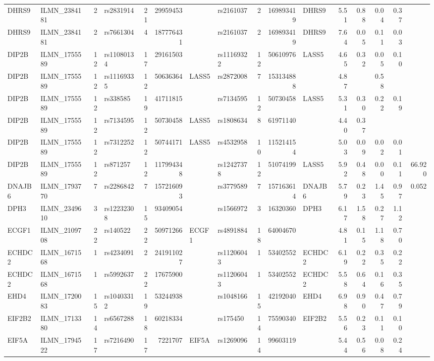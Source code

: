 \documentclass{article}
\begin{document}
\begin{landscape}
{\begin{ThreePartTable}
\begin{longtable}{|llr|lrrl|lrrl|rrrr|r|}
DHRS9 & ILMN\_2384181 & 2 & rs2831914 & 21 & 29959453 &  & rs2161037 & 2 & 169893419 & DHRS9 & 5.51 & 0.88 & 0.04 & 0.37 &  \\
DHRS9 & ILMN\_2384181 & 2 & rs7661304 & 4 & 187776431 &  & rs2161037 & 2 & 169893419 & DHRS9 & 7.64 & 0.05 & 0.11 & 0.03 &  \\
DIP2B & ILMN\_1755589 & 12 & rs11080134 & 17 & 29161503 &  & rs11169322 & 12 & 50610976 & LASS5 & 4.65 & 0.32 & 0.05 & 0.10 &  \\
DIP2B & ILMN\_1755589 & 12 & rs11169335 & 12 & 50636364 & LASS5 & rs2872008 & 7 & 153134888 &  & 4.87 &  & 0.58 &  &  \\
DIP2B & ILMN\_1755589 & 12 & rs338585 & 19 & 41711815 &  & rs7134595 & 12 & 50730458 & LASS5 & 5.31 & 0.30 & 0.22 & 0.19 &  \\
DIP2B & ILMN\_1755589 & 12 & rs7134595 & 12 & 50730458 & LASS5 & rs1808634 & 8 & 61971140 &  & 4.40 & 0.37 &  &  &  \\
DIP2B & ILMN\_1755589 & 12 & rs7312252 & 12 & 50744171 & LASS5 & rs4532958 & 10 & 115214154 &  & 5.03 & 0.09 & 0.02 & 0.01 &  \\
DIP2B & ILMN\_1755589 & 12 & rs871257 & 12 & 117994348 &  & rs12427378 & 12 & 51074199 & LASS5 & 5.92 & 0.48 & 0.00 & 0.11 & 66.920 \\
DNAJB6 & ILMN\_1793770 & 7 & rs2286842 & 7 & 157216093 &  & rs3779589 & 7 & 157163614 & DNAJB6 & 5.79 & 0.23 & 1.45 & 0.97 & 0.052 \\
DPH3 & ILMN\_2349610 & 3 & rs12232308 & 15 & 93409054 &  & rs1566972 & 3 & 16320360 & DPH3 & 6.17 & 1.58 & 0.27 & 1.12 &  \\
ECGF1 & ILMN\_2109708 & 22 & rs140522 & 22 & 50971266 & ECGF1 & rs4891884 & 18 & 64004670 &  & 4.81 & 0.15 & 1.18 & 0.70 &  \\
ECHDC2 & ILMN\_1671568 & 1 & rs4234091 & 2 & 241911027 &  & rs11206043 & 1 & 53402552 & ECHDC2 & 6.19 & 0.22 & 0.35 & 0.22 &  \\
ECHDC2 & ILMN\_1671568 & 1 & rs5992637 & 22 & 17675900 &  & rs11206043 & 1 & 53402552 & ECHDC2 & 5.58 & 0.64 & 0.16 & 0.35 &  \\
EHD4 & ILMN\_1720083 & 15 & rs10403312 & 19 & 53244938 &  & rs1048166 & 15 & 42192040 & EHD4 & 6.98 & 0.90 & 0.47 & 0.79 &  \\
EIF2B2 & ILMN\_1713380 & 14 & rs6567288 & 18 & 60218334 &  & rs175450 & 14 & 75590340 & EIF2B2 & 5.56 & 0.23 & 0.11 & 0.10 &  \\
EIF5A & ILMN\_1794522 & 17 & rs7216490 & 17 & 7221707 & EIF5A & rs1269096 & 14 & 99603119 &  & 5.44 & 0.56 & 0.08 & 0.24 &  \\

\end{longtable}
\end{ThreePartTable}}
\end{landscape}
\end{document}
